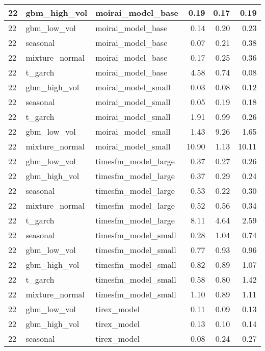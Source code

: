 {\begin{tabular}{lllrrr}
\midrule
22 & gbm\_high\_vol & moirai\_model\_base & 0.19 & 0.17 & 0.19 \\
\midrule
22 & gbm\_low\_vol & moirai\_model\_base & 0.14 & 0.20 & 0.23 \\
\midrule
22 & seasonal & moirai\_model\_base & 0.07 & 0.21 & 0.38 \\
\midrule
22 & mixture\_normal & moirai\_model\_base & 0.17 & 0.25 & 0.36 \\
\midrule
22 & t\_garch & moirai\_model\_base & 4.58 & 0.74 & 0.08 \\
\midrule
22 & gbm\_high\_vol & moirai\_model\_small & 0.03 & 0.08 & 0.12 \\
\midrule
22 & seasonal & moirai\_model\_small & 0.05 & 0.19 & 0.18 \\
\midrule
22 & t\_garch & moirai\_model\_small & 1.91 & 0.99 & 0.26 \\
\midrule
22 & gbm\_low\_vol & moirai\_model\_small & 1.43 & 9.26 & 1.65 \\
\midrule
22 & mixture\_normal & moirai\_model\_small & 10.90 & 1.13 & 10.11 \\
\midrule
22 & gbm\_low\_vol & timesfm\_model\_large & 0.37 & 0.27 & 0.26 \\
\midrule
22 & gbm\_high\_vol & timesfm\_model\_large & 0.37 & 0.29 & 0.24 \\
\midrule
22 & seasonal & timesfm\_model\_large & 0.53 & 0.22 & 0.30 \\
\midrule
22 & mixture\_normal & timesfm\_model\_large & 0.52 & 0.56 & 0.34 \\
\midrule
22 & t\_garch & timesfm\_model\_large & 8.11 & 4.64 & 2.59 \\
\midrule
22 & seasonal & timesfm\_model\_small & 0.28 & 1.04 & 0.74 \\
\midrule
22 & gbm\_low\_vol & timesfm\_model\_small & 0.77 & 0.93 & 0.96 \\
\midrule
22 & gbm\_high\_vol & timesfm\_model\_small & 0.82 & 0.89 & 1.07 \\
\midrule
22 & t\_garch & timesfm\_model\_small & 0.58 & 0.80 & 1.42 \\
\midrule
22 & mixture\_normal & timesfm\_model\_small & 1.10 & 0.89 & 1.11 \\
\midrule
22 & gbm\_low\_vol & tirex\_model & 0.11 & 0.09 & 0.13 \\
\midrule
22 & gbm\_high\_vol & tirex\_model & 0.13 & 0.10 & 0.14 \\
\midrule
22 & seasonal & tirex\_model & 0.08 & 0.24 & 0.27 \\
\midrule

\end{tabular}}
